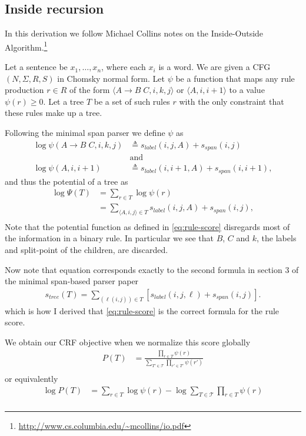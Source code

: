 \subsection{Inside recursion}

In this derivation we follow Michael Collins notes on the Inside-Outside Algorithm.\footnote{\url{http://www.cs.columbia.edu/~mcollins/io.pdf}}

Let a sentence be $x_1,\dots,x_n$, where each $x_i$
is a word. We are given a CFG $(N, \Sigma, R, S)$ in Chomsky normal
form. Let $\psi$ be a function that maps any rule production $r \in R$ of the form $\langle A \to B \;C, i, k, j \rangle$ or $\langle A, i, i+1 \rangle$ to a value $\psi(r) \geq 0$. Let a tree $T$ be a set of such rules $r$ with the only constraint that these rules make up a tree.

Following the minimal span parser we define $\psi$ as
\begin{align}
\label{eq:rule-score}
    \log\psi(A \to B \;C, i, k, j) &\triangleq s_{label}(i, j, A) + s_{span}(i, j) \\
    &\text{and} \\
    \log\psi(A, i, i+1) &\triangleq s_{label}(i, i+1, A) + s_{span}(i, i+1),
\end{align}
and thus the potential of a tree as
\begin{align}
\label{eq:tree-score}
    \log\Psi(T) &= \sum_{r \in T} \log\psi(r) \\
        &= \sum_{\langle A, i, j \rangle \in T} s_{label}(i, j, A) + s_{span}(i, j), \\
\end{align}
Note that the potential function as defined in \ref{eq:rule-score} disregards most of the information in a binary rule. In particular we see that $B$, $C$ and $k$, the labels and split-point of the children, are discarded.

Now note that equation \label{eq:tree-score} corresponds exactly to the second formula in section 3 of the minimal span-based parser paper
\begin{align}
s_{tree}(T) = \sum_{(\ell(i,j))\in T}[s_{label}(i, j, \ell) + s_{span}(i, j)] .
\end{align}
which is how I derived that \ref{eq:rule-score} is the correct formula for the rule score.

We obtain our CRF objective when we normalize this score globally
\begin{align}
\label{eq:crf-objective}
    P(T) &= \frac{\prod_{r \in T} \psi(r)}{\sum_{T' \in \mathcal{T}} \prod_{r' \in T'} \psi(r')} \\
\end{align}
or equivalently
\begin{align}
\label{eq:logcrf-objective}
    \log P(T) &= \sum_{r \in T} \log \psi(r) - \log \sum_{T \in \mathcal{T}} \prod_{r \in T} \psi(r) \\
\end{align}

